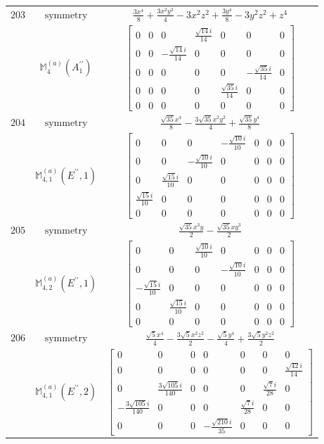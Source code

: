 \documentclass[fleqn,8pt,landscape]{jsarticle}
\begin{document}
\begin{longtable}{ccc}
$ 203 $ & $ \text{symmetry} $ & $ \frac{3 x^{4}}{8} + \frac{3 x^{2} y^{2}}{4} - 3 x^{2} z^{2} + \frac{3 y^{4}}{8} - 3 y^{2} z^{2} + z^{4} $ \\
$  $ & $ \mathbb{M}_{4}^{(a)}(A_{1}^{\prime\prime}) $ & $ \begin{bmatrix} 0 & 0 & 0 & \frac{\sqrt{14} i}{14} & 0 & 0 & 0 \\ 0 & 0 & - \frac{\sqrt{14} i}{14} & 0 & 0 & 0 & 0 \\ 0 & 0 & 0 & 0 & 0 & - \frac{\sqrt{35} i}{14} & 0 \\ 0 & 0 & 0 & 0 & \frac{\sqrt{35} i}{14} & 0 & 0 \\ 0 & 0 & 0 & 0 & 0 & 0 & 0 \end{bmatrix} $ \\ \hline
$ 204 $ & $ \text{symmetry} $ & $ \frac{\sqrt{35} x^{4}}{8} - \frac{3 \sqrt{35} x^{2} y^{2}}{4} + \frac{\sqrt{35} y^{4}}{8} $ \\
$  $ & $ \mathbb{M}_{4,1}^{(a)}(E^{\prime\prime},1) $ & $ \begin{bmatrix} 0 & 0 & 0 & - \frac{\sqrt{10} i}{10} & 0 & 0 & 0 \\ 0 & 0 & - \frac{\sqrt{10} i}{10} & 0 & 0 & 0 & 0 \\ 0 & \frac{\sqrt{15} i}{10} & 0 & 0 & 0 & 0 & 0 \\ \frac{\sqrt{15} i}{10} & 0 & 0 & 0 & 0 & 0 & 0 \\ 0 & 0 & 0 & 0 & 0 & 0 & 0 \end{bmatrix} $ \\ \hline
$ 205 $ & $ \text{symmetry} $ & $ \frac{\sqrt{35} x^{3} y}{2} - \frac{\sqrt{35} x y^{3}}{2} $ \\
$  $ & $ \mathbb{M}_{4,2}^{(a)}(E^{\prime\prime},1) $ & $ \begin{bmatrix} 0 & 0 & \frac{\sqrt{10} i}{10} & 0 & 0 & 0 & 0 \\ 0 & 0 & 0 & - \frac{\sqrt{10} i}{10} & 0 & 0 & 0 \\ - \frac{\sqrt{15} i}{10} & 0 & 0 & 0 & 0 & 0 & 0 \\ 0 & \frac{\sqrt{15} i}{10} & 0 & 0 & 0 & 0 & 0 \\ 0 & 0 & 0 & 0 & 0 & 0 & 0 \end{bmatrix} $ \\ \hline
$ 206 $ & $ \text{symmetry} $ & $ \frac{\sqrt{5} x^{4}}{4} - \frac{3 \sqrt{5} x^{2} z^{2}}{2} - \frac{\sqrt{5} y^{4}}{4} + \frac{3 \sqrt{5} y^{2} z^{2}}{2} $ \\
$  $ & $ \mathbb{M}_{4,1}^{(a)}(E^{\prime\prime},2) $ & $ \begin{bmatrix} 0 & 0 & 0 & 0 & 0 & 0 & 0 \\ 0 & 0 & 0 & 0 & 0 & 0 & \frac{\sqrt{42} i}{14} \\ 0 & \frac{3 \sqrt{105} i}{140} & 0 & 0 & 0 & \frac{\sqrt{7} i}{28} & 0 \\ - \frac{3 \sqrt{105} i}{140} & 0 & 0 & 0 & \frac{\sqrt{7} i}{28} & 0 & 0 \\ 0 & 0 & 0 & - \frac{\sqrt{210} i}{35} & 0 & 0 & 0 \end{bmatrix} $ \\ \hline

\end{longtable}
\end{document}
